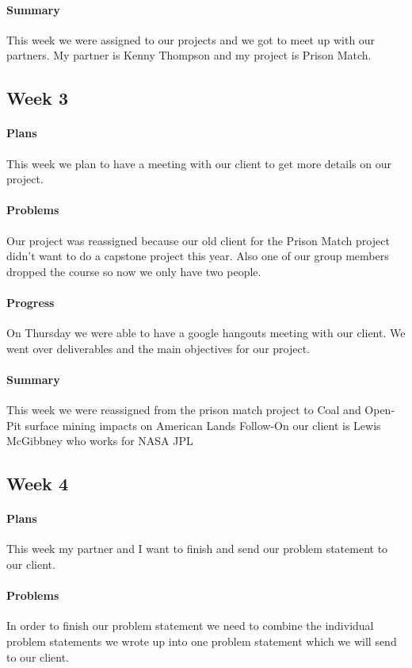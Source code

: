 \documentclass{article}
\begin{document}
\paragraph{Summary}
This week we were assigned to our projects and we got to meet up with our partners. My partner is Kenny Thompson and my project is Prison Match.
\subsection{Week 3}
\paragraph{Plans}
This week we plan to have a meeting with our client to get more details on our project. 
\paragraph{Problems}
Our project was reassigned because our old client for the Prison Match project didn't want to do a capstone project this year. Also one of our group members dropped the course so now we only have two people. 
\paragraph{Progress}
On Thursday we were able to have a google hangouts meeting with our client. We went over deliverables and the main objectives for our project. 
\paragraph{Summary}
This week we were reassigned from the prison match project to  Coal and Open-Pit surface mining impacts on American Lands Follow-On our client is Lewis McGibbney who works for NASA JPL
\subsection{Week 4}
\paragraph{Plans}
This week my partner and I want to finish and send our problem statement to our client.
\paragraph{Problems}
 In order to finish our problem statement we need to combine the individual problem statements we wrote up into one problem statement which we will send to our client.
\end{document}
